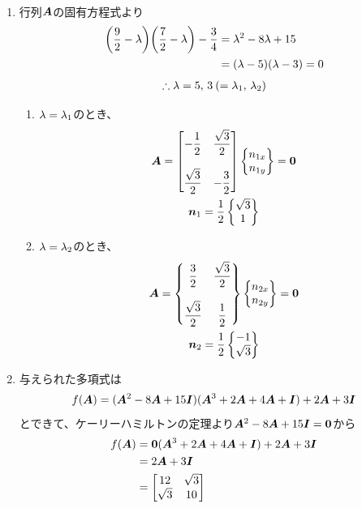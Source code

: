 \begin{ans*}
  ${}$
  \begin{enumerate}[label=\alph*)]
    \item 行列$\bm{A}$の固有方程式より
    \begin{align}
      \biggl(\frac{9}{2} - {\lambda}\biggr)\biggl(\frac{7}{2} - {\lambda}\biggr) - \frac{3}{4}
      &= {\lambda}^2 - 8{\lambda} + 15 \\
      &= ({\lambda} - 5)({\lambda} - 3) = 0 \\
    \end{align}
    \begin{gather}
      \therefore {\lambda} = 5,\,3\:(={\lambda}_1,\,{\lambda}_2)
    \end{gather}
    \begin{enumerate}[label=(\roman*)]
      \item ${\lambda} = {\lambda}_1$のとき、
      \begin{gather}
        \bm{A} = \begin{bmatrix}
          \displaystyle -\frac{1}{2} & \displaystyle\frac{\sqrt{3}}{2} \\
          & \\
          \displaystyle\frac{\sqrt{3}}{2} & \displaystyle -\frac{3}{2}
        \end{bmatrix}\begin{Bmatrix}
          n_{1x} \\ n_{1y}
        \end{Bmatrix}=\bm{0} \\
        {\bm{n}}_1 = \frac{1}{2}\begin{Bmatrix}
          \sqrt{3} \\ 1
        \end{Bmatrix}
      \end{gather}
      \item ${\lambda} = {\lambda}_2$のとき、
      \begin{gather}
        \bm{A} = \begin{Bmatrix}
          \displaystyle \frac{3}{2} & \displaystyle\frac{\sqrt{3}}{2} \\
          & \\
          \displaystyle \frac{\sqrt{3}}{2} & \displaystyle \frac{1}{2}
        \end{Bmatrix}\begin{Bmatrix}
          n_{2x} \\ n_{2y}
        \end{Bmatrix}=\bm{0} \\
        {\bm{n}}_2 = \frac{1}{2}\begin{Bmatrix}
          -1 \\ \sqrt{3}
        \end{Bmatrix}
      \end{gather}
    \end{enumerate}
    \item 与えられた多項式は
    \begin{gather}
      f(\bm{A})
      = (\bm{A}^2 - 8\bm{A} + 15\bm{I})(\bm{A}^3 + 2\bm{A} + 4\bm{A} + \bm{I}) + 2\bm{A} + 3\bm{I}
    \end{gather}
    とできて、ケーリーハミルトンの定理より$\bm{A}^2 - 8\bm{A} + 15\bm{I}=\bm{0}$から
    \begin{align}
      f(\bm{A})
      &= \bm{0} (\bm{A}^3 + 2\bm{A} + 4\bm{A} + \bm{I}) + 2\bm{A} + 3\bm{I} \\
      &= 2\bm{A} + 3\bm{I} \\
      &= \begin{bmatrix}
        12 & \sqrt{3} \\
        \sqrt{3} & 10
      \end{bmatrix}
    \end{align}
  \end{enumerate}
\end{ans*}


